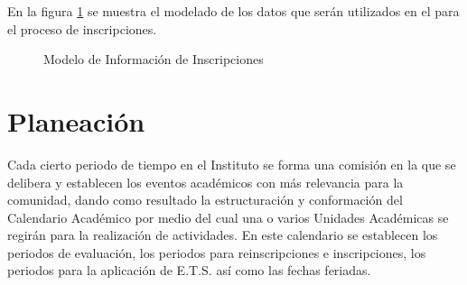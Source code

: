En la figura \ref{fig:infoInscripciones} se muestra el modelado de los datos que serán utilizados en el  para el proceso de inscripciones.

\begin{figure}[hbtp!]
	\begin{center}
		\caption{Modelo de Información de Inscripciones}
		\label{fig:infoInscripciones}
	\end{center}
\end{figure}

\section{Planeación}

	Cada cierto periodo de tiempo en el Instituto se forma una comisión en la que se delibera y establecen los eventos académicos con más relevancia para la comunidad, dando como resultado la estructuración y conformación del Calendario Académico por medio del cual una o varios Unidades Académicas se regirán para la realización de actividades. En este calendario se establecen los periodos de evaluación, los periodos para reinscripciones e inscripciones, los periodos para la aplicación de E.T.S. así como las fechas feriadas.\\

